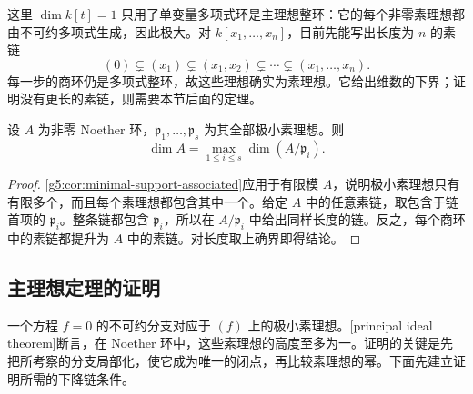 \ProseParagraphBreak

这里 \(\dim k[t]=1\) 只用了单变量多项式环是主理想整环：它的每个非零素理想都由不可约多项式生成，因此极大。对 \(k[x_1,\ldots,x_n]\)，目前先能写出长度为 \(n\) 的素链
\begin{equation}\label{g5:eq:coordinate-prime-chain}
	(0)\subsetneq(x_1)\subsetneq(x_1,x_2)
	\subsetneq\cdots\subsetneq(x_1,\ldots,x_n).
\end{equation}
每一步的商环仍是多项式整环，故这些理想确实为素理想。它给出维数的下界；证明没有更长的素链，则需要本节后面的定理。

\begin{proposition}\label{g5:prop:dimension-minimal-components}
	设 \(A\) 为非零 Noether 环，\(\mathfrak p_1,\ldots,\mathfrak p_s\) 为其全部极小素理想。则
	\[
	\dim A=\max_{1\leq i\leq s}\dim(A/\mathfrak p_i).
	\]
\end{proposition}
\begin{proof}
	\cref{g5:cor:minimal-support-associated}应用于有限模 \(A\)，说明极小素理想只有有限多个，而且每个素理想都包含其中一个。给定 \(A\) 中的任意素链，取包含于链首项的 \(\mathfrak p_i\)。整条链都包含 \(\mathfrak p_i\)，所以在 \(A/\mathfrak p_i\) 中给出同样长度的链。反之，每个商环中的素链都提升为 \(A\) 中的素链。对长度取上确界即得结论。
\end{proof}

\subsection{主理想定理的证明}
\label{g5:subsec:0303:02}

一个方程 \(f=0\) 的不可约分支对应于 \((f)\) 上的极小素理想。[principal ideal theorem]断言，在 Noether 环中，这些素理想的高度至多为一。证明的关键是先把所考察的分支局部化，使它成为唯一的闭点，再比较素理想的幂。下面先建立证明所需的下降链条件。

